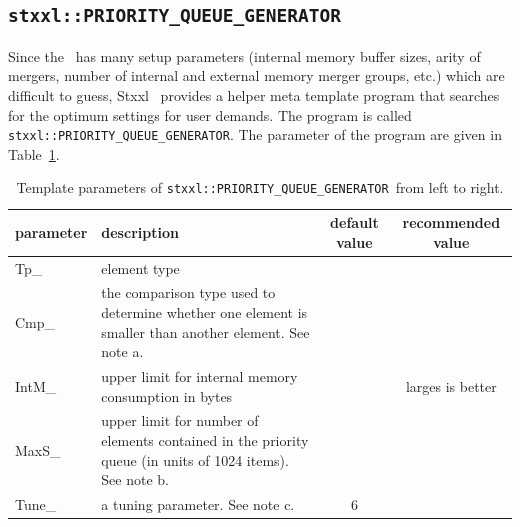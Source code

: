 \documentclass[twoside]{book}
\newcommand{\stxxl}{{\sc Stxxl} }
\begin{document}
\newcommand{\xpqueueg}{\texttt{stxxl::PRIORITY\_QUEUE\_GENERATOR}}

\subsection{\xpqueueg}
Since the \xpqueue\ has many setup parameters (internal memory
buffer sizes, arity of mergers, number of internal and external memory
merger groups, etc.) which are difficult to guess, \stxxl\ provides a
helper meta template program 
that searches for the optimum settings for user demands. The program
is called \xpqueueg. The parameter of the program are given in
Table~\ref{pqueueparam}.

\begin{table}[h]
\begin{center}
\caption{Template parameters of \xpqueueg\ from left to right.}
\label{pqueueparam}
\begin{tabular}{|l|p{4.5cm}|c|c|}
\hline
parameter& description  & default value & recommended value \\
\hline\hline
Tp\_       & element type & & \\
\hline
Cmp\_ & the comparison type used to determine whether one element is
smaller than another element. See note a.& & \\ 
\hline
IntM\_ & upper limit for internal memory consumption in bytes & &
larges is better\\
\hline
MaxS\_ & upper limit for number of elements contained in the priority
queue (in units of 1024 items). See note b. & & \\ 
\hline
Tune\_ & a tuning parameter. See note c. & 6 &\\
\hline
\end{tabular}
\end{center}
\end{table}
\end{document}
